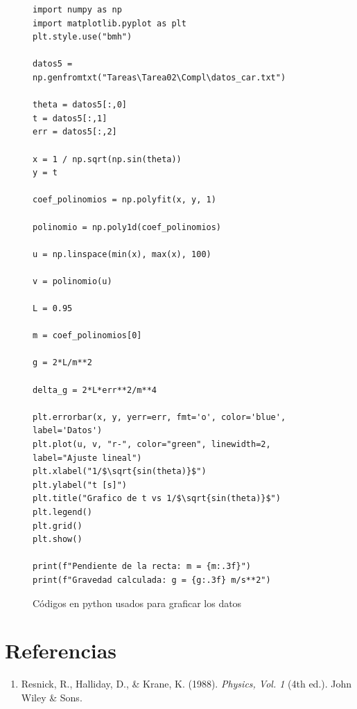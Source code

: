 \documentclass{article}
\begin{document}
\begin{multicols}{2}
    \begin{figure}[H]
        \begin{center}
        \begin{adjustbox}{max width=1.0\linewidth}
        \begin{lstlisting}
import numpy as np
import matplotlib.pyplot as plt
plt.style.use("bmh")

datos5 = np.genfromtxt("Tareas\Tarea02\Compl\datos_car.txt")

theta = datos5[:,0]
t = datos5[:,1]
err = datos5[:,2]

x = 1 / np.sqrt(np.sin(theta))
y = t              

coef_polinomios = np.polyfit(x, y, 1)

polinomio = np.poly1d(coef_polinomios)

u = np.linspace(min(x), max(x), 100)

v = polinomio(u)

L = 0.95

m = coef_polinomios[0]

g = 2*L/m**2

delta_g = 2*L*err**2/m**4

plt.errorbar(x, y, yerr=err, fmt='o', color='blue', label='Datos')
plt.plot(u, v, "r-", color="green", linewidth=2, label="Ajuste lineal")
plt.xlabel("1/$\sqrt{sin(theta)}$")
plt.ylabel("t [s]")
plt.title("Grafico de t vs 1/$\sqrt{sin(theta)}$")
plt.legend()
plt.grid()
plt.show()

print(f"Pendiente de la recta: m = {m:.3f}")
print(f"Gravedad calculada: g = {g:.3f} m/s**2")
        \end{lstlisting}
        \end{adjustbox}
        \end{center}
    \caption{Códigos en python usados para graficar los datos}
    \label{fig:car1}
    \end{figure}

\section*{Referencias}
    \begin{enumerate}
    
        \item \label{1} Resnick, R., Halliday, D., \& Krane, K. (1988). 
        \textit{Physics, Vol. 1} (4th ed.). John Wiley \& Sons. 
    
    \end{enumerate}
\end{multicols}
\end{document}
